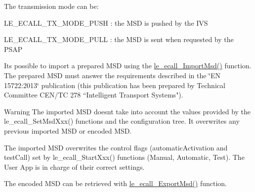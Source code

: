 The transmission mode can be\+:
\begin{DoxyItemize}
\item {\ttfamily L\+E\+\_\+\+E\+C\+A\+L\+L\+\_\+\+T\+X\+\_\+\+M\+O\+D\+E\+\_\+\+P\+U\+S\+H} \+: the M\+S\+D is pushed by the I\+V\+S
\item {\ttfamily L\+E\+\_\+\+E\+C\+A\+L\+L\+\_\+\+T\+X\+\_\+\+M\+O\+D\+E\+\_\+\+P\+U\+L\+L} \+: the M\+S\+D is sent when requested by the P\+S\+A\+P
\end{DoxyItemize}

It\textquotesingle{}s possible to import a prepared M\+S\+D using the \hyperlink{le__ecall__interface_8h_a85c4c3b921b9a6b0bc10f9400e58113e}{le\+\_\+ecall\+\_\+\+Import\+Msd()} function. The prepared M\+S\+D must answer the requirements described in the \char`\"{}\+E\+N 15722\+:2013\char`\"{} publication (this publication has been prepared by Technical Committee C\+E\+N/\+T\+C 278 “\+Intelligent Transport Systems").

\begin{DoxyWarning}{Warning}
The imported M\+S\+D doesn\textquotesingle{}t take into account the values provided by the le\+\_\+ecall\+\_\+\+Set\+Msd\+Xxx() functions and the configuration tree. It overwrites any previous imported M\+S\+D or encoded M\+S\+D.

The imported M\+S\+D overwrites the control flags (automatic\+Activation and test\+Call) set by le\+\_\+ecall\+\_\+\+Start\+Xxx() functions (Manual, Automatic, Test). The User App is in charge of their correct settings.
\end{DoxyWarning}
The encoded M\+S\+D can be retrieved with \hyperlink{le__ecall__interface_8h_aebdb7744c37081fda6398031d3ee1198}{le\+\_\+ecall\+\_\+\+Export\+Msd()} function.

